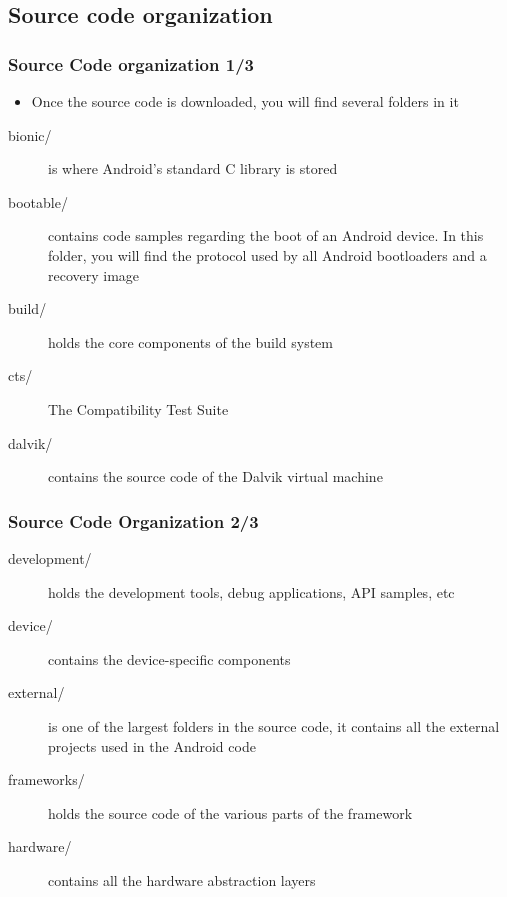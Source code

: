 \subsection{Source code organization}
\begin{frame}
  \frametitle{Source Code organization 1/3}
  \begin{itemize}
  \item Once the source code is downloaded, you will find several
    folders in it
  \end{itemize}
  \begin{description}
  \item[bionic/] is where Android's standard C library is stored
  \item[bootable/] contains code samples regarding the boot of an
    Android device. In this folder, you will find the protocol used by
    all Android bootloaders and a recovery image
  \item[build/] holds the core components of the build system
  \item[cts/] The Compatibility Test Suite
  \item[dalvik/] contains the source code of the Dalvik virtual
    machine
  \end{description}
\end{frame}

\begin{frame}
  \frametitle{Source Code Organization 2/3}
  \begin{description}
  \item[development/] holds the development tools, debug applications,
    API samples, etc
  \item[device/] contains the device-specific components
  \item[external/] is one of the largest folders in the source code, it
    contains all the external projects used in the Android code
  \item[frameworks/] holds the source code of the various parts of the
    framework
  \item[hardware/] contains all the hardware abstraction layers
  \end{description}
\end{frame}

